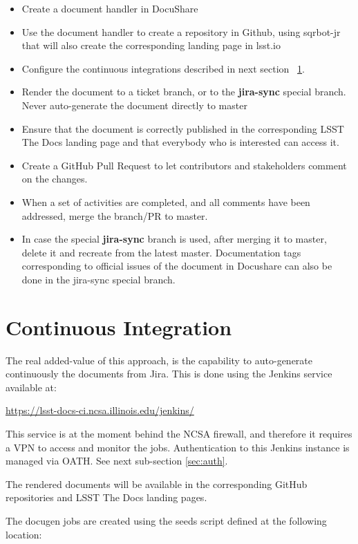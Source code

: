 \documentclass[DM]{lsstdoc}
\begin{document}
\begin{itemize}
\item Create a document handler in DocuShare
\item Use the document handler to create a repository in Github, using sqrbot-jr that will also create the corresponding landing page in lsst.io
\item Configure the continuous integrations described in next section ~\ref{sec:ci}.
\item Render the document to a ticket branch, or to the \textbf{jira-sync} special branch. Never auto-generate the document directly to master
\item Ensure that the document is correctly published in the corresponding LSST The Docs landing page and that everybody who is interested can access it.
\item Create a GitHub Pull Request to let contributors and stakeholders comment on the changes.
\item When a set of activities are completed, and all comments have been addressed, merge the branch/PR to master.
\item In case the special \textbf{jira-sync} branch is used, after merging it to master, delete it  and recreate from the latest master. Documentation tags corresponding to official issues of the document in Docushare can also be done in the jira-sync special branch.
\end{itemize}



\section{Continuous Integration}\label{sec:ci}

The real added-value of this approach, is the capability to auto-generate continuously the documents from Jira.
This is done using the Jenkins service available at:

\url{https://lsst-docs-ci.ncsa.illinois.edu/jenkins/}

This service is at the moment behind the NCSA firewall, and therefore it requires a VPN to access and monitor the jobs.
Authentication to this Jenkins instance is managed via OATH. See next sub-section \ref{sec:auth}.

The rendered documents will be available in the corresponding GitHub repositories and LSST The Docs landing pages.

The docugen jobs are created using the seeds script defined at the following location:
\end{document}
